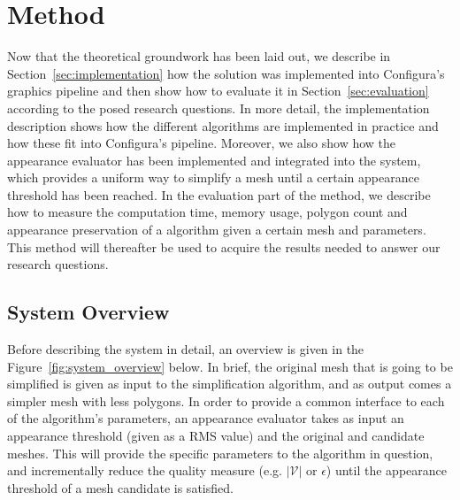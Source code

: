 
\chapter{Method} \label{cha:method}

    Now that the theoretical groundwork has been laid out, we describe in Section~\ref{sec:implementation} how the solution was implemented into Configura's graphics pipeline and then show how to evaluate it in Section~\ref{sec:evaluation} according to the posed research questions. In more detail, the implementation description shows how the different algorithms are implemented in practice and how these fit into Configura's pipeline. Moreover, we also show how the appearance evaluator has been implemented and integrated into the system, which provides a uniform way to simplify a mesh until a certain appearance threshold has been reached. In the evaluation part of the method, we describe how to measure the computation time, memory usage, polygon count and appearance preservation of a algorithm given a certain mesh and parameters. This method will thereafter be used to acquire the results needed to answer our research questions.

    \section{System Overview} \label{sec:system_overview}

    Before describing the system in detail, an overview is given in the Figure~\ref{fig:system_overview} below. In brief, the original mesh that is going to be simplified is given as input to the simplification algorithm, and as output comes a simpler mesh with less polygons. In order to provide a common interface to each of the algorithm's parameters, an appearance evaluator takes as input an appearance threshold (given as a RMS value) and the original and candidate meshes. This will provide the specific parameters to the algorithm in question, and incrementally reduce the quality measure (e.g. $|\mathcal{V}|$ or $\epsilon$) until the appearance threshold of a mesh candidate is satisfied.

